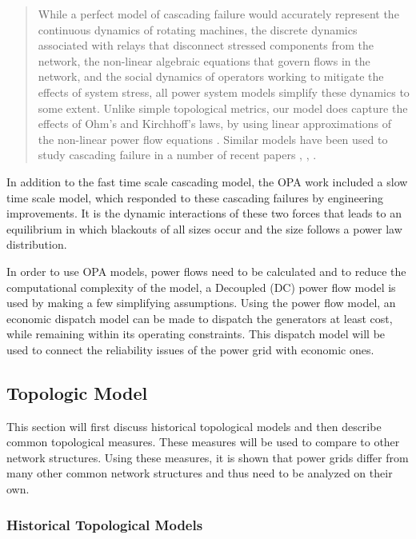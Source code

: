 \begin{quote}
While a perfect model of cascading failure would accurately represent the continuous dynamics of rotating machines, the discrete dynamics associated with relays that disconnect stressed components from the network, the non-linear algebraic equations that govern flows in the network, and the social dynamics of operators working to mitigate the effects of system stress, all power system models simplify these dynamics to some extent. Unlike simple topological metrics, our model does capture the effects of Ohm's and Kirchhoff's laws, by using linear approximations of the non-linear power flow equations \cite{bergen_1986}. Similar models have been used to study cascading failure in a number of recent papers \cite{carreras_2004}, \cite{dobson_2007}, \cite{mei_2009}.
\end{quote}

In addition to the fast time scale cascading model, the OPA work included a slow time scale model, which responded to these cascading failures by engineering improvements.  It is the dynamic interactions of these two forces that leads to an equilibrium in which blackouts of all sizes occur and the size follows a power law distribution.

In order to use OPA models, power flows need to be calculated and to reduce the computational complexity of the model, a Decoupled (DC) power flow model is used by making a few simplifying assumptions.  Using the power flow model, an economic dispatch model can be made to dispatch the generators at least cost, while remaining within its operating constraints.  This dispatch model will be used to connect the reliability issues of the power grid with economic ones.

\subsection{Topologic Model}

This section will first discuss historical topological models and then describe common topological measures.  These measures will be used to compare to other network structures.  Using these measures, it is shown that power grids differ from many other common network structures and thus need to be analyzed on their own.  

\subsubsection{Historical Topological Models}

